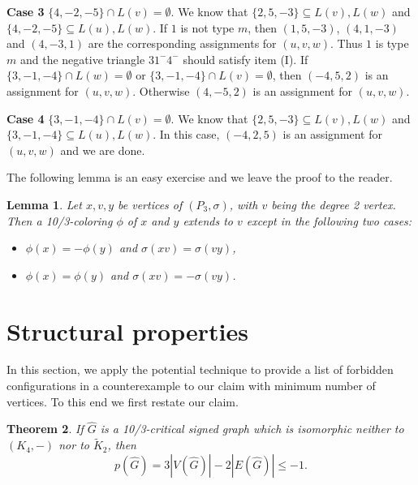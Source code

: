 \documentclass[11pt,a4paper]{article}
\makeatletter
\renewenvironment{proof}[1][\proofname]{\par
	\pushQED{\qed}%
	\normalfont \topsep6\p@\@plus6\p@\relax
	\trivlist
	\item[\hskip\labelsep
	\bfseries
	#1\@addpunct{.}]\ignorespaces
}{%
	\popQED\endtrivlist\@endpefalse
}
\newtheorem{theorem}{Theorem}
\newtheorem{lemma}[theorem]{Lemma}
\theoremstyle{definition}
\makeatother
\begin{document}
\begin{proof}
		 {\bf Case 3} $\{4, -2, -5\}\cap L(v)=\emptyset$. We know that $\{2, 5, -3\}\subseteq L(v), L(w)$ and $\{4, -2, -5\}\subseteq L(u), L(w)$. If $1$ is not type $m$, then $(1, 5, -3)$, $(4,1, -3)$ and $(4, -3, 1)$ are the corresponding assignments for $(u,v,w)$. Thus $1$ is type $m$ and the negative triangle $31^{-}4^{-}$ should satisfy item (I). If  $\{3, -1, -4\}\cap L(w)=\emptyset$ or  $\{3, -1, -4\}\cap L(v)=\emptyset$, then  $(-4, 5, 2)$  is an  assignment for $(u,v,w)$. Otherwise $(4, -5, 2)$ is an assignment for $(u,v,w)$.
		 		
		{\bf Case 4} $\{3, -1, -4 \}\cap L(v)=\emptyset$.  We know that $\{2, 5, -3\}\subseteq L(v), L(w)$ and $\{3, -1, -4\}\subseteq L(u), L(w)$. In this case, $(-4, 2, 5)$ is an assignment for $(u, v, w)$ and we are done.		
			\end{proof}
	
	
	
	
	The following lemma is an easy exercise and we leave the proof to the reader.
	
	\begin{lemma}\label{lem:2-vertex}
		Let $x,v,y$ be vertices of $(P_3,\sigma)$, with $v$ being the degree 2 vertex. Then a 10/3-coloring $\phi$ of $x$ and $y$ extends to $v$ except in the following two cases:
		
		\begin{itemize}
			\item $\phi(x) = -\phi(y)$  and $\sigma(xv)=\sigma(vy)$,
			\item $\phi(x) = \phi(y)$ and $\sigma(xv)= -\sigma(vy)$.
			
		\end{itemize}
	\end{lemma}
	

	
	\section{Structural properties} %
In this section, we apply the potential technique to provide a list of forbidden configurations in a counterexample to our claim with minimum number of vertices. To this end we first restate our claim.


\begin{theorem}\label{thm:main}
	If $\widehat{G}$ is a 10/3-critical signed graph which is isomorphic neither to $(K_4,-)$ nor to $\widetilde{K}_2$, then $$p(\widehat{G})=3|V(\widehat{G})|-2|E(\widehat{G})|\leq -1.$$
\end{theorem}
\end{document}
